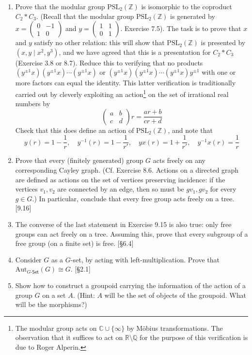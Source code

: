 \begin{enumerate}
    \item Prove that the modular group $\text{PSL}_2(\mathbb{Z})$ is isomorphic to the coproduct $C_2 \ast C_3$. (Recall that the modular group $\text{PSL}_2(\mathbb{Z})$ is generated by $x = \begin{pmatrix} 0 & -1 \\ 1 & 0 \end{pmatrix}$ and $y = \begin{pmatrix} 1 & 1 \\ 0 & 1 \end{pmatrix}$. Exercise 7.5). The task is to prove that $x$ and $y$ satisfy no other relation: this will show that $\text{PSL}_2(\mathbb{Z})$ is presented by $(x, y \mid x^2, y^3)$, and we have agreed that this is a presentation for $C_2 \ast C_3$ (Exercise 3.8 or 8.7). Reduce this to verifying that no products $(y^{\pm 1}x)(y^{\pm 1}x) \cdots (y^{\pm 1}x)$ or $(y^{\pm 1}x)(y^{\pm 1}x) \cdots (y^{\pm 1}x) y^{\pm 1}$ with one or more factors can equal the identity. This latter verification is traditionally carried out by cleverly exploiting an action\footnote{The modular group acts on $\mathbb{C} \cup \{\infty\}$ by Möbius transformations. The observation that it suffices to act on $\mathbb{R} \setminus \mathbb{Q}$ for the purpose of this verification is due to Roger Alperin.} on the set of irrational real numbers by
          \[ \begin{pmatrix} a & b \\ c & d \end{pmatrix} r = \frac{ar+b}{cr+d} \]
          Check that this does define an action of $\text{PSL}_2(\mathbb{Z})$, and note that
          \[ y(r) = 1-\frac{1}{r}, \quad y^{-1}(r) = 1-\frac{1}{r'}, \quad yx(r) = 1+\frac{1}{r'}, \quad y^{-1}x(r) = \frac{1}{r} \]

    \item Prove that every (finitely generated) group $G$ acts freely on any corresponding Cayley graph. (Cf. Exercise 8.6. Actions on a directed graph are defined as actions on the set of vertices preserving incidence: if the vertices $v_1, v_2$ are connected by an edge, then so must be $gv_1, gv_2$ for every $g \in G$.) In particular, conclude that every free group acts freely on a tree. [9.16]

    \item The converse of the last statement in Exercise 9.15 is also true: only free groups can act freely on a tree. Assuming this, prove that every subgroup of a free group (on a finite set) is free. [\S6.4]

    \item Consider $G$ as a $G$-set, by acting with left-multiplication. Prove that $\text{Aut}_{G\text{-}\mathsf{Set}}(G) \cong G$. [\S2.1]

    \item Show how to construct a groupoid carrying the information of the action of a group $G$ on a set $A$. (Hint: $A$ will be the set of objects of the groupoid. What will be the morphisms?)
\end{enumerate}